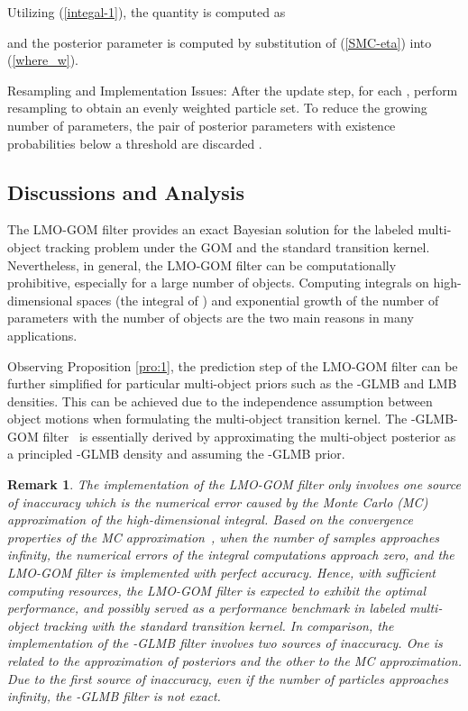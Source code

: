 \documentclass[journal]{IEEEtran}
\newtheorem{Rem}{Remark}
\begin{document}
{Utilizing (\ref{integal-1}), the quantity  is computed as 

and the posterior parameter  is computed by substitution of (\ref{SMC-eta}) into (\ref{where_w}).

Resampling and Implementation Issues: After the update step, for each , perform resampling \cite{refr:SMC_Gordon} to obtain an evenly weighted particle
set. To reduce the growing number of parameters, the pair of posterior parameters  with existence probabilities  below a threshold are discarded \cite{refr:label_1,refr:label_3,refr:label_6}.






\subsection{Discussions and Analysis}
The LMO-GOM filter provides an exact Bayesian solution for the labeled multi-object tracking problem under the GOM and the standard transition kernel. Nevertheless, in general, the LMO-GOM filter can be computationally prohibitive, especially for a large number of objects. Computing integrals on high-dimensional spaces (the integral of ) and exponential growth of the number of parameters with the number of objects are the two main reasons
in many applications. 

Observing  Proposition \ref{pro:1}, the   prediction step of the LMO-GOM filter can be further simplified for particular multi-object priors such as the -GLMB and LMB densities. 
This can be achieved due to the independence assumption between object motions when formulating the multi-object transition kernel. The -GLMB-GOM  filter~\cite{refr:label_6} is essentially derived  by approximating the multi-object posterior as a principled -GLMB density and assuming the -GLMB prior. 
\begin{Rem}\label{remark:3}
The implementation of the LMO-GOM  filter only involves  one source of inaccuracy which is the numerical error caused by the Monte Carlo (MC) approximation of the high-dimensional integral. 
Based on the convergence properties of the MC approximation~\cite{refr:convergence_partical}, when the number of samples approaches infinity, the numerical errors of the integral computations approach zero, and the LMO-GOM filter is implemented with perfect accuracy.  Hence, with sufficient computing resources, the LMO-GOM filter is expected to exhibit the optimal performance, and 
possibly served as a performance benchmark in labeled multi-object tracking with the standard transition kernel. 
In comparison,  the implementation of the -GLMB filter involves two sources of inaccuracy. One is related to the approximation of posteriors and the other to the MC approximation.   Due to the first source of inaccuracy, even if the number of particles approaches infinity, the -GLMB filter is not exact.
\end{Rem}


}
\end{document}
